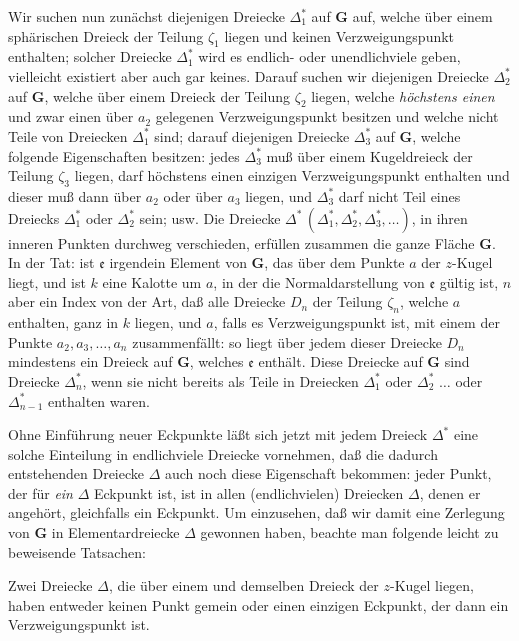 \documentclass{article}
\begin{document}
Wir suchen nun zunächst diejenigen Dreiecke $\Delta_1^*$ auf $\mathbf{G}$ auf, welche über einem sphärischen Dreieck der Teilung $\zeta_1$ liegen und keinen Verzweigungspunkt enthalten; solcher Dreiecke $\Delta_1^*$ wird es endlich- oder unendlichviele geben, vielleicht existiert aber auch gar keines. Darauf suchen wir diejenigen Dreiecke $\Delta_2^*$ auf $\mathbf{G}$, welche über einem Dreieck der Teilung $\zeta_2$ liegen, welche \emph{höchstens einen} und zwar einen über $a_2$ gelegenen Verzweigungspunkt besitzen und welche nicht Teile von Dreiecken $\Delta_1^*$ sind; darauf diejenigen Dreiecke $\Delta_3^*$ auf $\mathbf{G}$, welche folgende Eigenschaften besitzen: jedes $\Delta_3^*$ muß über einem Kugeldreieck der Teilung $\zeta_3$ liegen, darf höchstens einen einzigen Verzweigungspunkt enthalten und dieser muß dann über $a_2$ oder über $a_3$ liegen, und $\Delta_3^*$ darf nicht Teil eines Dreiecks $\Delta_1^*$ oder $\Delta_2^*$ sein; usw. Die Dreiecke $\Delta^*\,(\Delta_1^*, \Delta_2^*, \Delta_3^*, \dots)$, in ihren inneren Punkten durchweg verschieden, erfüllen zusammen die ganze Fläche $\mathbf{G}$. In der Tat: ist $\mathfrak{e}$ irgendein Element von $\mathbf{G}$, das über dem Punkte $a$ der $z$-Kugel liegt, und ist $k$ eine Kalotte um $a$, in der die Normaldarstellung von $\mathfrak{e}$ gültig ist, $n$ aber ein Index von der Art, daß alle Dreiecke $D_n$ der Teilung $\zeta_n$, welche $a$ enthalten, ganz in $k$ liegen, und $a$, falls es Verzweigungspunkt ist, mit einem der Punkte $a_2, a_3, \dots, a_n$ zusammenfällt: so liegt über jedem dieser Dreiecke $D_n$ mindestens ein Dreieck auf $\mathbf{G}$, welches $\mathfrak{e}$ enthält. Diese Dreiecke auf $\mathbf{G}$ sind Dreiecke $\Delta_n^*$, wenn sie nicht bereits als Teile in Dreiecken $\Delta_1^*$ oder $\Delta_2^*$ $\dots$ oder $\Delta_{n-1}^*$ enthalten waren.

Ohne Einführung neuer Eckpunkte läßt sich jetzt mit jedem Dreieck $\Delta^*$ eine solche Einteilung in endlichviele Dreiecke vornehmen, daß die dadurch entstehenden Dreiecke $\Delta$ auch noch diese Eigenschaft bekommen: jeder Punkt, der für \emph{ein} $\Delta$ Eckpunkt ist, ist in allen (endlichvielen) Dreiecken $\Delta$, denen er angehört, gleichfalls ein Eckpunkt. Um einzusehen, daß wir damit eine Zerlegung von $\mathbf{G}$ in Elementardreiecke $\Delta$ gewonnen haben, beachte man folgende leicht zu beweisende Tatsachen:

Zwei Dreiecke $\Delta$, die über einem und demselben Dreieck der $z$-Kugel liegen, haben entweder keinen Punkt gemein oder einen einzigen Eckpunkt, der dann ein Verzweigungspunkt ist.
\end{document}
